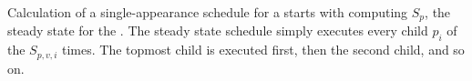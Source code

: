 \begin{comment}
Computing the amount of data peeked by the {\pipeline} during
initialization may be a little more complicated, because unlike
popping and pushing, peeking is not accumulative. Luckily, we can
rely on our knowledge of structure of the {\StreamIt} graph to
calculate the amount of data peeked by a {\pipeline}. We know that a
{\pipeline} is a single-input structure. We also know that this
single input will lead directly into a {\StreamIt} node.  There are
only three possibilities for what this node will be.

\begin{itemize}
\item If {\pipeline}'s first node is a {\filter} $f$ (the first child
of the {\pipeline} is a {\filter} or a {\pipeline} with a {\filter} as its
first node) then the extra amount of data peeked by the {\pipeline}
on initialization will be $e^i_f - o^i_f$. If the first child is a
{\filter}, then $p_0$ is $f$ and the extra amount peeked is also
$e^i_{p_0} - o^i_{p_0}$.  If the first child is a {\pipeline} with a
{\filter} first node, we can show by induction that this {\pipeline}'s
extra peek amount will also be $e^i_{p_0} - o^i_{p_0}$.

\item If {\pipeline}'s first node is a {\splitter} (the first child of
the {\pipeline} is a {\splitjoin} or a {\pipeline} with a {\splitter} as
its first node) then the extra amount of data peeked by the
{\pipeline} on initialization will be 0, because {\splitters} never
peek. Furthermore, for the same reason, the amount of extra data
peeked by the first child on its initialization will also be zero,
or $e^i_{p_0} - o^i_{p_0}= 0$.

\item If {\pipeline}'s first node is a {\joiner} (the first child of
the {\pipeline} is a {{\feedbackloop}} or a {\pipeline} with a {\joiner} as
its first node) then the amount of extra data peeked by the
{\pipeline} on initialization will be 0, for the same reasons as
above. And again $e^i_{p_0} - o^i_{p_0}= 0$.
\end{itemize}

Thus on initialization, the {\pipeline} will have an extra peek
amount of $e^i_{p_0} - o^i_{p_0}$, and the total amount of data
peeked by the {\pipeline} for initialization is $e^i_p = (e^i_{p_0}
- o^i_{p_0}) + l_0
* o_{p_0}$.
\end{comment}

\begin{comment}
The steady state state schedule is calculated as a
single-appearance schedule.
\end{comment}
Calculation of a single-appearance schedule for a {\pipeline} starts
with computing $S_p$, the steady state for the {\pipeline}. The
steady state schedule simply executes every child $p_i$ of the
{\pipeline} $S_{p,v,i}$ times. The topmost child is executed first,
then the second child, and so on.

